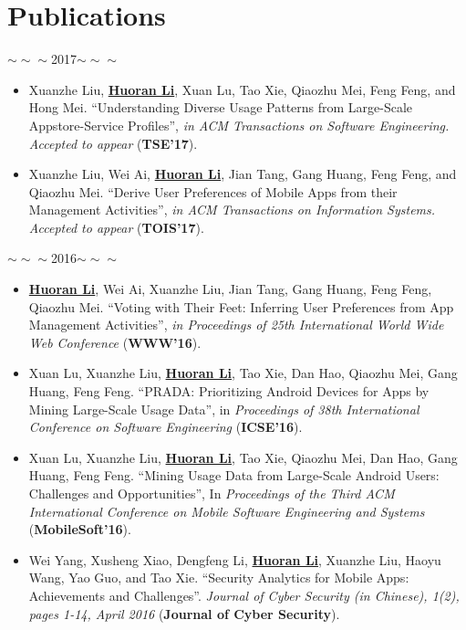 \documentclass[a4paper,10pt]{article}
\begin{document}
\section{Publications}

\begin{center}
\begin{large}
$\sim\sim\sim$2017$\sim\sim\sim$
\end{large}
\end{center}

\begin{itemize}
	\item Xuanzhe Liu, \textbf{\underline{Huoran Li}}, Xuan Lu, Tao Xie, Qiaozhu Mei, Feng Feng, and Hong Mei. ``Understanding Diverse Usage Patterns from Large-Scale Appstore-Service Profiles'', \textit{in ACM Transactions on Software Engineering. Accepted to appear}  (\textbf{TSE'17}).
	\item Xuanzhe Liu, Wei Ai, \textbf{\underline{Huoran Li}}, Jian Tang, Gang Huang, Feng Feng, and Qiaozhu Mei. ``Derive User Preferences of Mobile Apps from their Management Activities'', \textit{in ACM Transactions on Information Systems. Accepted to appear}  (\textbf{TOIS'17}).
\end{itemize}

\begin{center}
\begin{large}
$\sim\sim\sim$2016$\sim\sim\sim$
\end{large}
\end{center}

\begin{itemize}
	\item \textbf{\underline{Huoran Li}}, Wei Ai, Xuanzhe Liu, Jian Tang, Gang Huang, Feng Feng, Qiaozhu Mei. ``Voting with Their Feet: Inferring User Preferences from App Management Activities'', \textit{in Proceedings of 25th International World Wide Web Conference} (\textbf{WWW'16}).
	\item Xuan Lu, Xuanzhe Liu, \textbf{\underline{Huoran Li}}, Tao Xie, Dan Hao, Qiaozhu Mei, Gang Huang, Feng Feng. ``PRADA: Prioritizing Android Devices for Apps by Mining Large-Scale Usage Data'', in \textit{Proceedings of 38th International Conference on Software Engineering} (\textbf{ICSE'16}).
	\item Xuan Lu, Xuanzhe Liu, \textbf{\underline{Huoran Li}}, Tao Xie, Qiaozhu Mei, Dan Hao, Gang Huang, Feng Feng. ``Mining Usage Data from Large-Scale Android Users: Challenges and Opportunities'', In \textit{Proceedings of the Third ACM International Conference on Mobile Software Engineering and Systems} (\textbf{MobileSoft'16}).
	\item Wei Yang, Xusheng Xiao, Dengfeng Li, \textbf{\underline{Huoran Li}}, Xuanzhe Liu, Haoyu Wang, Yao Guo, and Tao Xie. ``Security Analytics for Mobile Apps: Achievements and Challenges''. \textit{Journal of Cyber Security (in Chinese), 1(2), pages 1-14, April 2016} (\textbf{Journal of Cyber Security}).
\end{itemize}
\end{document}
